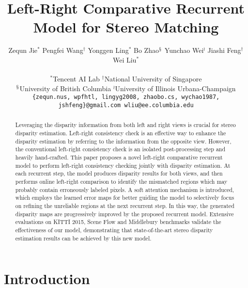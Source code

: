 \documentclass[10pt,twocolumn,letterpaper]{article}
\begin{document}
\title{Left-Right  Comparative Recurrent Model for Stereo Matching}

\author{Zequn Jie$^{*}$ \quad Pengfei Wang$^\dag$ \quad Yonggen Ling$^*$ \quad Bo Zhao$^\mathsection$ \quad Yunchao Wei$^\wr$ \quad Jiashi Feng$^\dag$ \quad Wei Liu$^*$ \\ \\
	$^*$Tencent AI Lab \quad  $^\dag$National University of Singapore \\ $^\mathsection$University of British  Columbia \quad $^\wr$University of Illinois Urbana-Champaign \\ {\tt\small \{zequn.nus, wpfhtl, lingyg2008, zhaobo.cs,  wychao1987, jshfeng\}@gmail.com \quad wliu@ee.columbia.edu}
}
\maketitle
\thispagestyle{empty}

\begin{abstract}
	Leveraging the disparity information from both  left and right views is crucial for stereo disparity estimation. Left-right consistency check is an effective way to enhance the disparity estimation by referring to the information from the opposite view. However, the conventional left-right consistency check is an isolated post-processing step and heavily hand-crafted. This paper proposes a novel left-right comparative recurrent model to perform left-right consistency checking jointly with   disparity estimation. At each recurrent step, the model produces disparity results for both views, and then performs online left-right comparison to identify the mismatched regions which may probably contain erroneously labeled pixels. A soft attention mechanism is introduced, which employs the learned error maps for better guiding the model to selectively focus on refining the unreliable regions at the next recurrent step. In this way, the generated disparity maps are progressively improved by the proposed recurrent model. Extensive evaluations on  KITTI 2015, Scene Flow and Middlebury benchmarks validate the effectiveness of our model,  demonstrating that state-of-the-art stereo disparity estimation results can be achieved by this new model.
\end{abstract}

\vspace{-0.5cm}
\section{Introduction}
\end{document}
